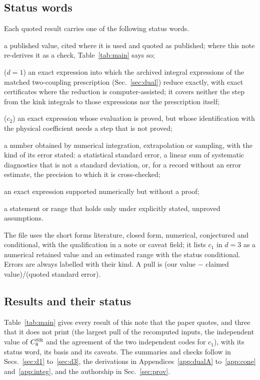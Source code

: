 \documentclass[11pt,a4paper]{article}
\numberwithin{equation}{section}
\newcommand{\CSR}{C^{\rm SR}}
\newcommand{\file}[1]{\path{#1}}
\begin{document}
\subsection{Status words}\label{sec:words}
Each quoted result carries one of the following status words.
\begin{description}[leftmargin=1.5em]
\item[literature] a published value, cited where it is used and quoted as published; where this note re-derives it
 as a check, Table~\ref{tab:main} says so;
\item[proved closed form within the prescription] ($d=1$) an exact expression into which the archived integral
 expressions of the matched two-coupling prescription (Sec.~\ref{sec:dual}) reduce exactly, with exact certificates
 where the reduction is computer-assisted; it covers neither the step from the kink integrals to those expressions nor
 the prescription itself;
\item[closed form conditional on one unproved step] ($c_2$) an exact expression whose evaluation is proved, but whose
 identification with the physical coefficient needs a step that is not proved;
\item[numerical] a number obtained by numerical integration, extrapolation or sampling, with the kind of its error
 stated: a statistical standard error, a linear sum of systematic diagnostics that is not a standard deviation, or,
 for a record without an error estimate, the precision to which it is cross-checked;
\item[conjectured] an exact expression supported numerically but without a proof;
\item[conditional] a statement or range that holds only under explicitly stated, unproved assumptions.
\end{description}
The file \file{results/sr_values.json} uses the short forms literature, closed form, numerical, conjectured and
conditional, with the qualification in a note or caveat field; it lists $c_1$ in $d=3$ as a numerical retained value
and an estimated range with the status conditional. Errors are always labelled with their kind. A pull is (our value $-$ claimed
value)/(quoted standard error).

\subsection{Results and their status}
Table~\ref{tab:main} gives every result of this note that the paper quotes, and three that it does not print (the
largest pull of the recomputed inputs, the independent value of $\CSR_8$ and the agreement of the two independent
codes for $c_1$), with its status word, its basis and its caveats. The summaries and checks follow in
Secs.~\ref{sec:d1} to~\ref{sec:d3}, the derivations in Appendices~\ref{app:dualA} to~\ref{app:cone}
and~\ref{app:integ}, and the authorship in Sec.~\ref{sec:prov}.
\end{document}
